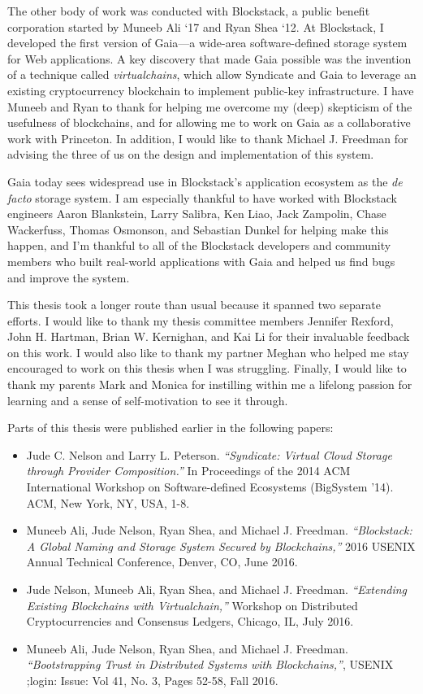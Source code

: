 The other body of work was conducted with Blockstack,
a public benefit corporation started by Muneeb Ali `17 and Ryan Shea
`12.  At Blockstack, I developed the first version of Gaia---a wide-area
software-defined storage system for Web applications.  A key discovery that
made Gaia possible was the invention of a technique called \emph{virtualchains},
which allow Syndicate and Gaia to leverage an existing cryptocurrency blockchain to
implement public-key infrastructure.  I have Muneeb and Ryan to thank for
helping me overcome my (deep) skepticism of
the usefulness of blockchains, and for allowing me to work on Gaia as a
collaborative work with Princeton.  In addition, I would like to thank Michael
J. Freedman for advising the three of us on the design and implementation of
this system.

Gaia today sees widespread use in Blockstack's application ecosystem as the
\emph{de facto} storage system.  I am especially thankful to have worked with
Blockstack engineers Aaron Blankstein, Larry Salibra, Ken
Liao, Jack Zampolin, Chase Wackerfuss, Thomas Osmonson, and Sebastian Dunkel for
helping make this happen, and I'm thankful to all of the Blockstack developers
and community members who built real-world applications with Gaia and helped us
find bugs and improve the system.

This thesis took a longer route than usual because it spanned two separate
efforts.  I would like to thank my thesis committee members Jennifer Rexford,
John H. Hartman, Brian W. Kernighan, and Kai Li for their invaluable feedback on
this work.  I would also like to thank my partner Meghan who helped me stay
encouraged to work on this thesis when I was
struggling.  Finally, I would like to thank my parents Mark and Monica for
instilling within me a lifelong passion for learning and a sense of
self-motivation to see it through.

Parts of this thesis were published earlier in the following papers:

\begin{itemize}
\item Jude C. Nelson and Larry L. Peterson. \emph{``Syndicate: Virtual Cloud
Storage through Provider Composition.''} In Proceedings of the 2014 ACM
International Workshop on Software-defined Ecosystems (BigSystem '14).
ACM, New York, NY, USA, 1-8.
\item Muneeb Ali, Jude Nelson, Ryan Shea, and Michael J. Freedman.
\emph{``Blockstack: A Global Naming and Storage System Secured by
Blockchains,''} 2016 USENIX Annual Technical Conference, Denver, CO, June 2016.
\item Jude Nelson, Muneeb Ali, Ryan Shea, and Michael J. Freedman.
\emph{``Extending Existing Blockchains with Virtualchain,''} Workshop on
Distributed Cryptocurrencies and Consensus Ledgers, Chicago, IL, July 2016.
\item Muneeb Ali, Jude Nelson, Ryan Shea, and Michael J. Freedman.
\emph{``Bootstrapping Trust in Distributed Systems with Blockchains,''}, USENIX
;login: Issue: Vol 41, No. 3, Pages 52-58, Fall 2016.
\end{itemize}

